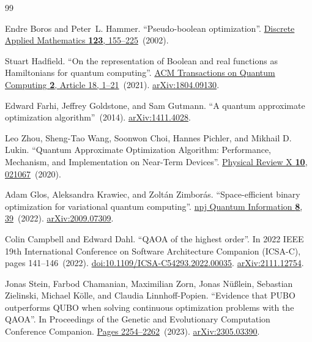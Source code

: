 \documentclass[a4paper,onecolumn,11pt,unpublished]{quantumarticle}
\theoremstyle{remark}
\begin{document}
\FloatBarrier\clearpage
\begin{thebibliography}{99}

Endre Boros and Peter~L. Hammer.
\newblock ``Pseudo-boolean optimization''.
\newblock \href{https://dx.doi.org/10.1016/S0166-218X(01)00341-9}{Discrete Applied Mathematics {\bf 123}, 155--225}~(2002).

Stuart Hadfield.
\newblock ``On the representation of Boolean and real functions as Hamiltonians for quantum computing''.
\newblock \href{https://dx.doi.org/10.1145/3478519}{ACM Transactions on Quantum Computing {\bf 2}, Article 18, 1--21}~(2021).
\newblock \href{http://arxiv.org/abs/1804.09130}{arXiv:1804.09130}.

Edward Farhi, Jeffrey Goldstone, and Sam Gutmann.
\newblock ``A quantum approximate optimization algorithm''~(2014).
\newblock \href{http://arxiv.org/abs/1411.4028}{arXiv:1411.4028}.

Leo Zhou, Sheng-Tao Wang, Soonwon Choi, Hannes Pichler, and Mikhail D. Lukin.
\newblock ``Quantum Approximate Optimization Algorithm: Performance, Mechanism, and Implementation on Near-Term Devices''.
\newblock \href{https://doi.org/10.1103/physrevx.10.021067}{Physical Review X {\bf 10}, 021067}~(2020).

Adam Glos, Aleksandra Krawiec, and Zolt{\'a}n Zimbor{\'a}s.
\newblock ``Space-efficient binary optimization for variational quantum computing''.
\newblock \href{https://dx.doi.org/10.1038/s41534-022-00546-y}{npj Quantum Information {\bf 8}, 39}~(2022).
\newblock \href{http://arxiv.org/abs/2009.07309}{arXiv:2009.07309}.

Colin Campbell and Edward Dahl.
\newblock ``QAOA of the highest order''.
\newblock In 2022 IEEE 19th International Conference on Software Architecture Companion (ICSA-C), pages 141--146~(2022).
\newblock \href{https://dx.doi.org/10.1109/ICSA-C54293.2022.00035}{doi:10.1109/ICSA-C54293.2022.00035}.
\newblock \href{http://arxiv.org/abs/2111.12754}{arXiv:2111.12754}.

Jonas Stein, Farbod Chamanian, Maximilian Zorn, Jonas N{\"u}{\ss}lein, Sebastian Zielinski, Michael K{\"o}lle, and Claudia Linnhoff-Popien.
\newblock ``Evidence that PUBO outperforms QUBO when solving continuous optimization problems with the QAOA''.
\newblock In Proceedings of the Genetic and Evolutionary Computation Conference Companion.
\newblock \href{https://dx.doi.org/10.1145/3583133.3596358}{Pages 2254--2262}~(2023).
\newblock \href{http://arxiv.org/abs/2305.03390}{arXiv:2305.03390}.


\end{thebibliography}
\end{document}
